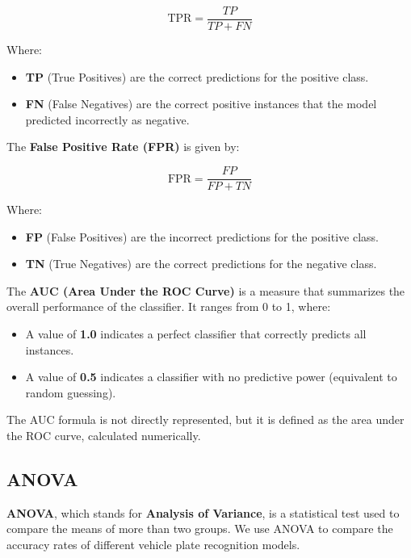 \documentclass[conference]{IEEEtran}
\begin{document}
    \[
    \text{TPR} = \frac{TP}{TP + FN}
    \]
    
    Where:
    
    \begin{itemize}
        \item \textbf{TP} (True Positives) are the correct predictions for the positive class.
        \item \textbf{FN} (False Negatives) are the correct positive instances that the model predicted incorrectly as negative.
    \end{itemize}
    
    The \textbf{False Positive Rate (FPR)} is given by:
    
    \[
    \text{FPR} = \frac{FP}{FP + TN}
    \]
    
    Where:
    
    \begin{itemize}
        \item \textbf{FP} (False Positives) are the incorrect predictions for the positive class.
        \item \textbf{TN} (True Negatives) are the correct predictions for the negative class.
    \end{itemize}
    
    The \textbf{AUC (Area Under the ROC Curve)} is a measure that summarizes the overall performance of the classifier. It ranges from 0 to 1, where:
    
    \begin{itemize}
        \item A value of \textbf{1.0} indicates a perfect classifier that correctly predicts all instances.
        \item A value of \textbf{0.5} indicates a classifier with no predictive power (equivalent to random guessing).
    \end{itemize}
    
    The AUC formula is not directly represented, but it is defined as the area under the ROC curve, calculated numerically.
    
    \subsection{ANOVA}
    
    \textbf{ANOVA}, which stands for \textbf{Analysis of Variance}, is a statistical test used to compare the means of more than two groups. We use ANOVA to compare the accuracy rates of different vehicle plate recognition models.
    
\end{document}
